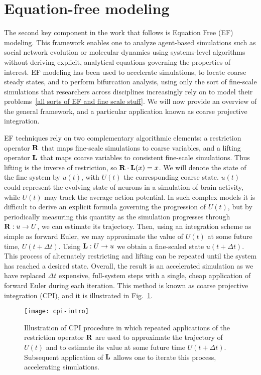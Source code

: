 
\section{Equation-free modeling\label{sec:ef}}

The second key component in the work that follows is Equation Free
(EF) modeling. This framework enables one to analyze agent-based
simulations such as social network evolution or molecular dynamics
using systems-level algorithms without deriving explicit, analytical
equations governing the properties of interest. EF modeling has been
used to accelerate simulations, to locate coarse steady states, and to
perform bifurcation analysis, using only the sort of fine-scale
simulations that researchers across disciplines increasingly rely on
to model their problems~\ref{all sorts of EF and fine scale stuff}. We
will now provide an overview of the general framework, and a particular
application known as coarse projective integration.

EF techniques rely on two complementary algorithmic elements: a
restriction operator $\mathbf{R}$ that maps fine-scale simulations to coarse
variables, and a lifting operator $\mathbf{L}$ that maps coarse variables to
consistent fine-scale simulations. Thus lifting is the inverse of
restriction, so $\mathbf{R} \cdot \mathbf{L} (x) = x$. We will denote the state of
the fine system by $u(t)$, with $U(t)$ the corresponding coarse
state. $u(t)$ could represent the evolving state of neurons in a
simulation of brain activity, while $U(t)$ may track the average
action potential. In such complex models it is difficult to derive an
explicit formula governing the progression of $U(t)$, but by
periodically measuring this quantity as the simulation progresses
through $\mathbf{R}: u \rightarrow U$, we can estimate its trajectory. Then,
using an integration scheme as simple as forward Euler, we may
approximate the value of $U(t)$ at some future time,
$U(t + \Delta t)$. Using $\mathbf{L}: U \rightarrow u$ we obtain a
fine-scaled state $u(t + \Delta t)$. This process of alternately
restricting and lifting can be repeated until the system has reached a
desired state. Overall, the result is an accelerated simulation as we
have replaced $\Delta t$ expensive, full-system steps with a single,
cheap application of forward Euler during each iteration. This method
is known as coarse projective integration (CPI), and it is illustrated
in Fig.~\ref{fig:cpi-ill}.

\begin{figure}
  \centering
  \texttt{[image: cpi-intro]}
  \caption[Illustration of coarse projective integration]{Illustration
    of CPI procedure in which repeated applications of the restriction
    operator $\mathbf{R}$ are used to approximate the trajectory of $U(t)$
    and to estimate its value at some future time $U(t + \Delta
    t)$. Subsequent application of $\mathbf{L}$ allows one to iterate this
    process, accelerating simulations. \label{fig:cpi-ill}}
\end{figure}
